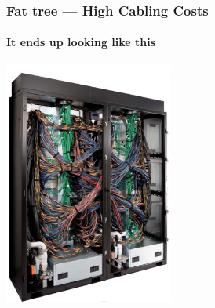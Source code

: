\documentclass[xcolor={rgb,x11names,svgnames},rgb,x11names,svgnames]{beamer}
\begin{document}

\begin{frame}
  \frametitle{Fat tree --- High Cabling Costs}
  \framesubtitle{It ends up looking like this}

  \centering
  \includegraphics[height=8cm]{wiring}
\end{frame}

\end{document}
